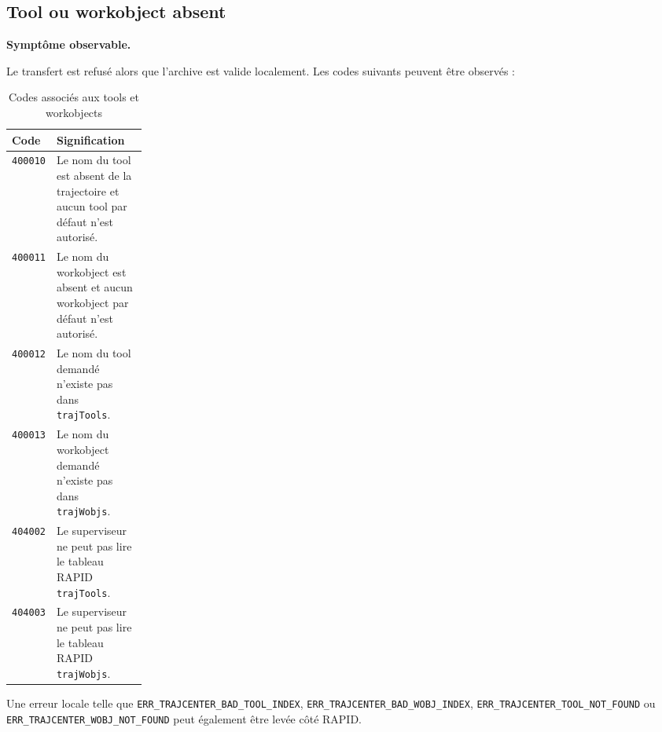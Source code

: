 \documentclass{rapportENSAM}
\begin{document}
\subsection{Tool ou workobject absent}
\label{subsec:diagnostic-tool-wobj}

\textbf{Symptôme observable.}

Le transfert est refusé alors que l'archive est valide localement. Les codes
suivants peuvent être observés :

\begin{table}[ht]
    \centering
    \begin{tabularx}{\linewidth}{
        |p{0.20\linewidth}
        |X|
    }
        \hline
        \textbf{Code} &
        \textbf{Signification} \\
        \hline

        \texttt{400010} &
        Le nom du tool est absent de la trajectoire et aucun tool par défaut
        n'est autorisé. \\
        \hline

        \texttt{400011} &
        Le nom du workobject est absent et aucun workobject par défaut n'est
        autorisé. \\
        \hline

        \texttt{400012} &
        Le nom du tool demandé n'existe pas dans \texttt{trajTools}. \\
        \hline

        \texttt{400013} &
        Le nom du workobject demandé n'existe pas dans
        \texttt{trajWobjs}. \\
        \hline

        \texttt{404002} &
        Le superviseur ne peut pas lire le tableau RAPID
        \texttt{trajTools}. \\
        \hline

        \texttt{404003} &
        Le superviseur ne peut pas lire le tableau RAPID
        \texttt{trajWobjs}. \\
        \hline
    \end{tabularx}
    \caption{Codes associés aux tools et workobjects}
    \label{tab:diagnostic-tool-wobj-codes}
\end{table}

Une erreur locale telle que
\texttt{ERR\_TRAJCENTER\_BAD\_TOOL\_INDEX},
\texttt{ERR\_TRAJCENTER\_BAD\_WOBJ\_INDEX},
\texttt{ERR\_TRAJCENTER\_TOOL\_NOT\_FOUND} ou
\texttt{ERR\_TRAJCENTER\_WOBJ\_NOT\_FOUND} peut également être levée côté
RAPID.
\end{document}
